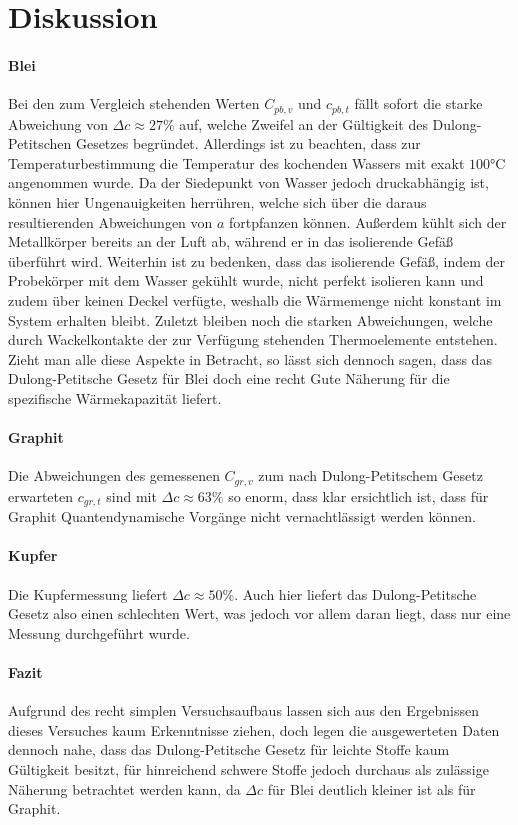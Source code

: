 \section{Diskussion}
\label{sec:Diskussion}


\paragraph{Blei}

Bei den zum Vergleich stehenden Werten $C_{pb,v}$ und $c_{pb,t}$ fällt sofort die starke Abweichung von $\Delta c \approx 27 \%$ auf, welche Zweifel an der Gültigkeit des Dulong-Petitschen Gesetzes begründet. Allerdings ist zu beachten, dass zur Temperaturbestimmung die Temperatur des kochenden Wassers mit exakt $100 \si{\celsius}$ angenommen wurde. Da der Siedepunkt von Wasser jedoch druckabhängig ist, können hier Ungenauigkeiten herrühren, welche sich über die daraus resultierenden Abweichungen von $a$ fortpfanzen können. Außerdem kühlt sich der Metallkörper bereits an der Luft ab, während er in das isolierende Gefäß überführt wird. Weiterhin ist zu bedenken, dass das isolierende Gefäß, indem der Probekörper mit dem Wasser gekühlt wurde, nicht perfekt isolieren kann und zudem über keinen Deckel verfügte, weshalb die Wärmemenge nicht konstant im System erhalten bleibt. Zuletzt bleiben noch die starken Abweichungen, welche durch Wackelkontakte der zur Verfügung stehenden Thermoelemente entstehen.
Zieht man alle diese Aspekte in Betracht, so lässt sich dennoch sagen, dass das Dulong-Petitsche Gesetz für Blei doch eine recht Gute Näherung für die spezifische Wärmekapazität liefert.

\paragraph{Graphit}
Die Abweichungen des gemessenen $C_{gr,v}$ zum nach Dulong-Petitschem Gesetz erwarteten $c_{gr,t}$ sind mit $\Delta c \approx 63 \%$ so enorm, dass klar ersichtlich ist, dass für Graphit Quantendynamische Vorgänge nicht vernachtlässigt werden können.

\paragraph{Kupfer}
Die Kupfermessung liefert $\Delta c \approx 50 \%$. Auch hier liefert das Dulong-Petitsche Gesetz also einen schlechten Wert, was jedoch vor allem daran liegt, dass nur eine Messung durchgeführt wurde.

\paragraph{Fazit}
Aufgrund des recht simplen Versuchsaufbaus lassen sich aus den Ergebnissen dieses Versuches kaum Erkenntnisse ziehen, doch legen die ausgewerteten Daten dennoch nahe, dass das Dulong-Petitsche Gesetz für leichte Stoffe kaum Gültigkeit besitzt, für hinreichend schwere Stoffe jedoch durchaus als zulässige Näherung betrachtet werden kann, da $\Delta c$ für Blei deutlich kleiner ist als für Graphit.
